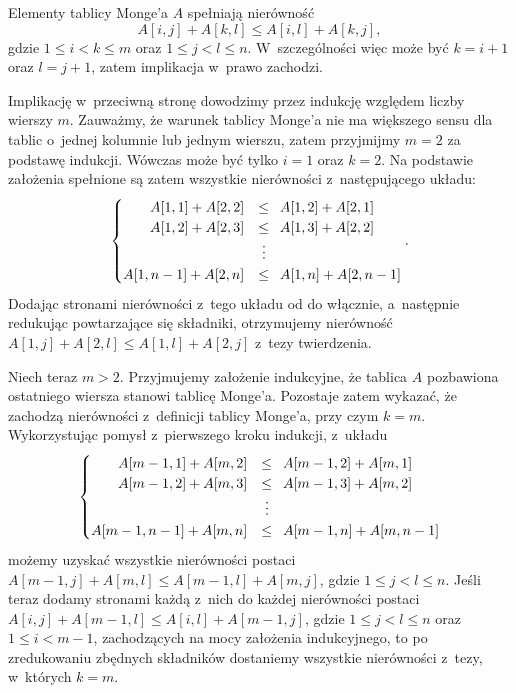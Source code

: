 
\subproblem %
Elementy tablicy Monge'a $A$ spełniają nierówność
\[
	A[i,j]+A[k,l] \le A[i,l]+A[k,j],
\]
gdzie $1\le i<k\le m$ oraz $1\le j<l\le n$.
W~szczególności więc może być $k=i+1$ oraz $l=j+1$, zatem implikacja w~prawo zachodzi.

Implikację w~przeciwną stronę dowodzimy przez indukcję względem liczby wierszy $m$.
Zauważmy, że warunek tablicy Monge'a nie ma większego sensu dla tablic o~jednej kolumnie lub jednym wierszu, zatem przyjmijmy $m=2$ za podstawę indukcji.
Wówczas może być tylko $i=1$ oraz $k=2$.
Na podstawie założenia spełnione są zatem wszystkie nierówności z~następującego układu:
\[
	\begin{cases}
		\hfill A[1,1]+A[2,2] &\le\,\,\, A[1,2]+A[2,1] \\
		\hfill A[1,2]+A[2,3] &\le\,\,\, A[1,3]+A[2,2] \\
		& \;\vdots \\
		A[1,n-1]+A[2,n] &\le\,\,\, A[1,n]+A[2,n-1] \\
	\end{cases}.
\]
Dodając stronami nierówności z~tego układu od  do  włącznie, a~następnie redukując powtarzające się składniki, otrzymujemy nierówność $A[1,j]+A[2,l]\le A[1,l]+A[2,j]$ z~tezy twierdzenia.

Niech teraz $m>2$.
Przyjmujemy założenie indukcyjne, że tablica $A$ pozbawiona ostatniego wiersza stanowi tablicę Monge'a.
Pozostaje zatem wykazać, że zachodzą nierówności z~definicji tablicy Monge'a, przy czym $k=m$.
Wykorzystując pomysł z~pierwszego kroku indukcji, z~układu
\[
	\begin{cases}
		\hfill A[m-1,1]+A[m,2] &\le\,\,\, A[m-1,2]+A[m,1] \\
		\hfill A[m-1,2]+A[m,3] &\le\,\,\, A[m-1,3]+A[m,2] \\
		& \;\vdots \\
		A[m-1,n-1]+A[m,n] &\le\,\,\, A[m-1,n]+A[m,n-1] \\
	\end{cases}
\]
możemy uzyskać wszystkie nierówności postaci $A[m-1,j]+A[m,l]\le A[m-1,l]+A[m,j]$, gdzie $1\le j<l\le n$.
Jeśli teraz dodamy stronami każdą z~nich do każdej nierówności postaci $A[i,j]+A[m-1,l]\le A[i,l]+A[m-1,j]$, gdzie $1\le j<l\le n$ oraz $1\le i<m-1$, zachodzących na mocy założenia indukcyjnego, to po zredukowaniu zbędnych składników dostaniemy wszystkie nierówności z~tezy, w~których $k=m$.

